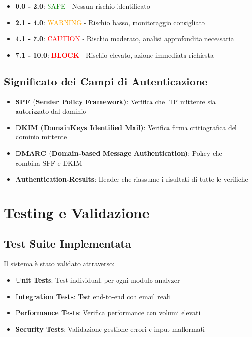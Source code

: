\documentclass{article}
\begin{document}
\begin{itemize}
    \item \textbf{0.0 - 2.0}: \textcolor{green}{SAFE} - Nessun rischio identificato
    \item \textbf{2.1 - 4.0}: \textcolor{orange}{WARNING} - Rischio basso, monitoraggio consigliato  
    \item \textbf{4.1 - 7.0}: \textcolor{red}{CAUTION} - Rischio moderato, analisi approfondita necessaria
    \item \textbf{7.1 - 10.0}: \textcolor{red}{\textbf{BLOCK}} - Rischio elevato, azione immediata richiesta
\end{itemize}

\subsection{Significato dei Campi di Autenticazione}

\begin{itemize}
    \item \textbf{SPF (Sender Policy Framework)}: Verifica che l'IP mittente sia autorizzato dal dominio
    \item \textbf{DKIM (DomainKeys Identified Mail)}: Verifica firma crittografica del dominio mittente
    \item \textbf{DMARC (Domain-based Message Authentication)}: Policy che combina SPF e DKIM
    \item \textbf{Authentication-Results}: Header che riassume i risultati di tutte le verifiche
\end{itemize}

\section{Testing e Validazione}

\subsection{Test Suite Implementata}

Il sistema è stato validato attraverso:

\begin{itemize}
    \item \textbf{Unit Tests}: Test individuali per ogni modulo analyzer
    \item \textbf{Integration Tests}: Test end-to-end con email reali
    \item \textbf{Performance Tests}: Verifica performance con volumi elevati
    \item \textbf{Security Tests}: Validazione gestione errori e input malformati
\end{itemize}
\end{document}
